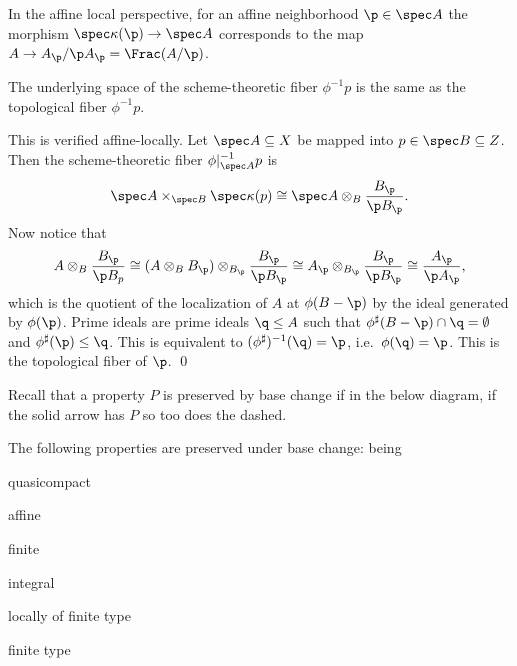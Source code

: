 In the affine local perspective, for an affine neighborhood $\p\in\spec A$ the morphism
$\spec\kappa(\p)\to\spec A$ corresponds to the map $A\to A_\p/\p A_\p=\Frac(A/\p)$.

\bprop

    The underlying space of the scheme-theoretic fiber $\phi^{-1}p$ is the same as the topological
    fiber $\phi^{-1}p$.

\eprop

\bproof

    This is verified affine-locally.
    Let $\spec A\subseteq X$ be mapped into $p\in\spec B\subseteq Z$.
    Then the scheme-theoretic fiber $\phi|_{\spec A}^{-1}p$ is
    $$ \spec A\times_{\spec B}\spec\kappa(p) \cong \spec A\otimes_B\frac{B_\p}{\p B_\p} . $$
    Now notice that
    $$ A\otimes_B\frac{B_\p}{\p B_p} \cong (A\otimes_BB_\p)\otimes_{B_\p}\frac{B_\p}{\p B_\p}
    \cong A_\p \otimes_{B_\p} \frac{B_\p}{\p B_\p} \cong \frac{A_\p}{\p A_\p} , $$
    which is the quotient of the localization of $A$ at $\phi(B-\p)$ by the ideal generated by $\phi(\p)$.
    Prime ideals are prime ideals $\q\leq A$ such that $\phi^\sharp(B-\p)\cap\q=\emptyset$ and
    $\phi^\sharp(\p)\leq\q$.
    This is equivalent to $(\phi^\sharp)^{-1}(\q)=\p$, i.e.\ $\phi(\q)=\p$.
    This is the topological fiber of $\p$.
    \qed

\eproof

Recall that a property $P$ is preserved by base change if in the below diagram, if the solid arrow has $P$
so too does the dashed.

\bthrm

    The following properties are preserved under base change: being
    \benum
        \item quasicompact
        \item affine
        \item finite
        \item integral
        \item locally of finite type
        \item finite type
    \eenum

\ethrm

